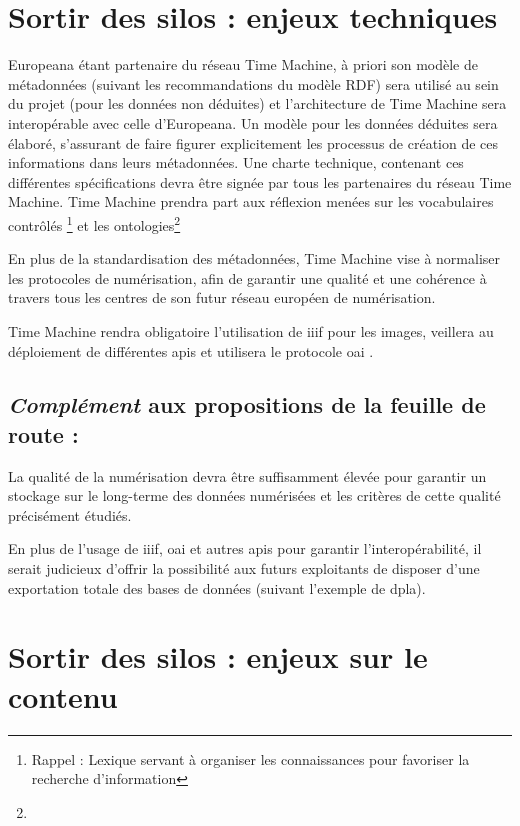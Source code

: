 \section {Sortir des silos : enjeux techniques}

Europeana étant partenaire du réseau Time Machine, à priori son modèle de métadonnées (suivant les recommandations du modèle RDF) sera utilisé au sein du projet (pour les données non déduites) et l'architecture de Time Machine sera interopérable avec celle d'Europeana. Un modèle pour les données déduites sera élaboré, s'assurant de faire figurer explicitement les processus de création de ces informations dans leurs métadonnées. Une charte technique, contenant ces différentes spécifications devra être signée par tous les partenaires du réseau Time Machine. Time Machine prendra part aux réflexion menées sur les vocabulaires contrôlés \footnote{Rappel : Lexique servant à organiser les connaissances pour favoriser la recherche d'information} et les ontologies\footnote{ }

En plus de la standardisation des métadonnées, Time Machine vise à normaliser les protocoles de numérisation, afin de garantir une qualité et une cohérence à travers tous les centres de son futur réseau européen de numérisation. 

Time Machine rendra obligatoire l'utilisation de \gls{iiif} pour les images, veillera au déploiement de différentes \gls{api}s et utilisera le protocole \gls{oai} .

\subsection{\textit{Complément} aux propositions de la feuille de route :}
La qualité de la numérisation devra être suffisamment élevée pour garantir un stockage sur le long-terme des données numérisées et les critères de cette qualité précisément étudiés.

En plus de l'usage de \gls{iiif}, \gls{oai} et autres \gls{api}s pour garantir l'interopérabilité, il serait judicieux d'offrir la possibilité aux futurs exploitants de disposer d'une exportation totale des bases de données (suivant l'exemple de \gls{dpla}).


\section {Sortir des silos : enjeux sur le contenu}

